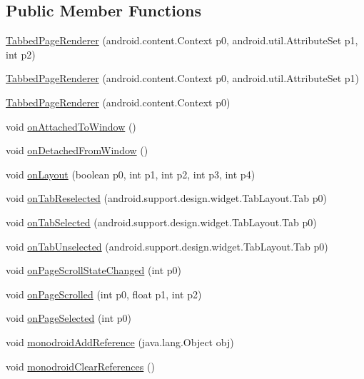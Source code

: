 \subsection*{Public Member Functions}
\begin{CompactItemize}
\item 
\hyperlink{classmd5270abb39e60627f0f200893b490a1ade_1_1_tabbed_page_renderer_29adb24329fe37a1044a6c6e485282a5}{TabbedPageRenderer} (android.content.Context p0, android.util.AttributeSet p1, int p2)
\item 
\hyperlink{classmd5270abb39e60627f0f200893b490a1ade_1_1_tabbed_page_renderer_a9ac414c6055675bf9eff78fe6f0672e}{TabbedPageRenderer} (android.content.Context p0, android.util.AttributeSet p1)
\item 
\hyperlink{classmd5270abb39e60627f0f200893b490a1ade_1_1_tabbed_page_renderer_eaaca922e7a247b9e498dce320b2fb99}{TabbedPageRenderer} (android.content.Context p0)
\item 
void \hyperlink{classmd5270abb39e60627f0f200893b490a1ade_1_1_tabbed_page_renderer_2ceb284d7b665527be964c40f6d41f74}{onAttachedToWindow} ()
\item 
void \hyperlink{classmd5270abb39e60627f0f200893b490a1ade_1_1_tabbed_page_renderer_2da48a997944fab9d1e33dfbf720a558}{onDetachedFromWindow} ()
\item 
void \hyperlink{classmd5270abb39e60627f0f200893b490a1ade_1_1_tabbed_page_renderer_c4353b82562a8ecc7822860dd790a58f}{onLayout} (boolean p0, int p1, int p2, int p3, int p4)
\item 
void \hyperlink{classmd5270abb39e60627f0f200893b490a1ade_1_1_tabbed_page_renderer_2f19345d253dcfa7a6ad6abbaf641e8a}{onTabReselected} (android.support.design.widget.TabLayout.Tab p0)
\item 
void \hyperlink{classmd5270abb39e60627f0f200893b490a1ade_1_1_tabbed_page_renderer_b3b382046f76dcb461f46c32f878ce21}{onTabSelected} (android.support.design.widget.TabLayout.Tab p0)
\item 
void \hyperlink{classmd5270abb39e60627f0f200893b490a1ade_1_1_tabbed_page_renderer_34344ed4429e52347801b12b7a69da61}{onTabUnselected} (android.support.design.widget.TabLayout.Tab p0)
\item 
void \hyperlink{classmd5270abb39e60627f0f200893b490a1ade_1_1_tabbed_page_renderer_6ee3c70ee2769ea4ce88b1c0e7accd74}{onPageScrollStateChanged} (int p0)
\item 
void \hyperlink{classmd5270abb39e60627f0f200893b490a1ade_1_1_tabbed_page_renderer_2be7798b85b19ace799e0aac88245757}{onPageScrolled} (int p0, float p1, int p2)
\item 
void \hyperlink{classmd5270abb39e60627f0f200893b490a1ade_1_1_tabbed_page_renderer_1d0954491d422f9bedb21658957b4bfb}{onPageSelected} (int p0)
\item 
void \hyperlink{classmd5270abb39e60627f0f200893b490a1ade_1_1_tabbed_page_renderer_c61a8f262b7596ff2eb4e667464f9d36}{monodroidAddReference} (java.lang.Object obj)
\item 
void \hyperlink{classmd5270abb39e60627f0f200893b490a1ade_1_1_tabbed_page_renderer_3b2f80dac52df3f43f79ec6bd4748239}{monodroidClearReferences} ()
\end{CompactItemize}
